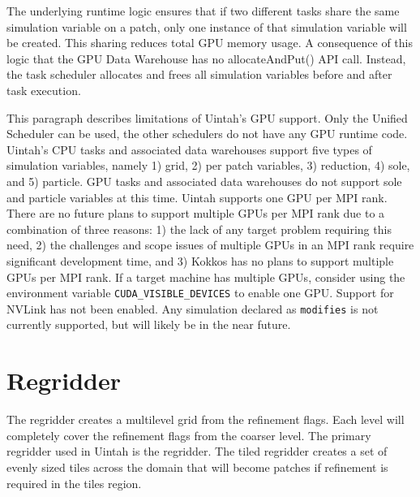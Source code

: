 The underlying runtime logic ensures that if two different tasks share the same simulation variable on a patch, only one instance of that simulation variable will be created.  This sharing reduces total GPU memory usage.  A consequence of this logic that the GPU Data Warehouse has no allocateAndPut() API call.  Instead, the task scheduler allocates and frees all simulation variables before and after task execution.   

This paragraph describes limitations of Uintah's GPU support.  Only the Unified Scheduler can be used, the other schedulers do not have any GPU runtime code.   Uintah's CPU tasks and associated data warehouses support five types of simulation variables, namely 1) grid, 2) per patch variables, 3) reduction, 4) sole, and 5) particle.  GPU tasks and associated data warehouses do not support sole and particle variables at this time.  Uintah supports one GPU per MPI rank.  There are no future plans to support multiple GPUs per MPI rank due to a combination of three reasons: 1) the lack of any target problem requiring this need, 2) the challenges and scope issues of multiple GPUs in an MPI rank require significant development time, and 3) Kokkos has no plans to support multiple GPUs per MPI rank.  If a target machine has multiple GPUs, consider using the environment variable \texttt{CUDA\_VISIBLE\_DEVICES} to enable one GPU.  Support for NVLink has not been enabled.  Any simulation declared as \texttt{modifies} is not currently supported, but will likely be in the near future.  

%
%


\section{Regridder}

The regridder creates a multilevel grid from the refinement flags.
Each level will completely cover the refinement flags from the coarser
level.  The primary regridder used in Uintah is the  regridder.
The tiled regridder creates a set of evenly sized tiles across the domain
that will become patches if refinement is required in the tiles region.

